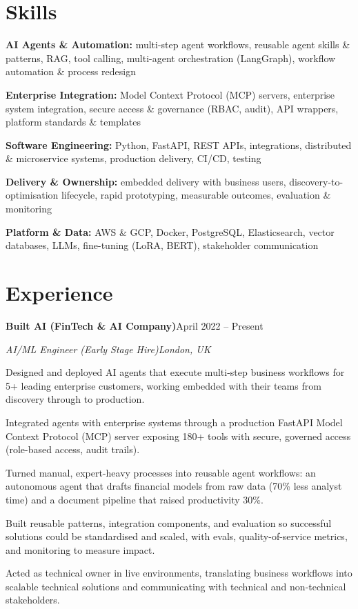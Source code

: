 \documentclass[10pt,a4paper]{article}
\newcommand{\entry}[4]{%
  {\color{company}\bfseries #1}\hfill {\color{muted}#2}\par
  \vspace{1pt}
  {\itshape #3}\hfill {\color{muted}\itshape #4}\par
  \vspace{3pt}%
}
\begin{document}
\section{Skills}
\begin{tight}
  \item[\textcolor{accent}{\small$\bullet$}] \textbf{AI Agents \& Automation:} multi-step agent workflows, reusable agent skills \& patterns, RAG, tool calling, multi-agent orchestration (LangGraph), workflow automation \& process redesign
  \item[\textcolor{accent}{\small$\bullet$}] \textbf{Enterprise Integration:} Model Context Protocol (MCP) servers, enterprise system integration, secure access \& governance (RBAC, audit), API wrappers, platform standards \& templates
  \item[\textcolor{accent}{\small$\bullet$}] \textbf{Software Engineering:} Python, FastAPI, REST APIs, integrations, distributed \& microservice systems, production delivery, CI/CD, testing
  \item[\textcolor{accent}{\small$\bullet$}] \textbf{Delivery \& Ownership:} embedded delivery with business users, discovery-to-optimisation lifecycle, rapid prototyping, measurable outcomes, evaluation \& monitoring
  \item[\textcolor{accent}{\small$\bullet$}] \textbf{Platform \& Data:} AWS \& GCP, Docker, PostgreSQL, Elasticsearch, vector databases, LLMs, fine-tuning (LoRA, BERT), stakeholder communication
\end{tight}

\section{Experience}
\entry{Built AI (FinTech \& AI Company)}{April 2022 -- Present}{AI/ML Engineer (Early Stage Hire)}{London, UK}
\begin{tight}
  \item Designed and deployed AI agents that execute multi-step business workflows for 5+ leading enterprise customers, working embedded with their teams from discovery through to production.
  \item Integrated agents with enterprise systems through a production FastAPI Model Context Protocol (MCP) server exposing 180+ tools with secure, governed access (role-based access, audit trails).
  \item Turned manual, expert-heavy processes into reusable agent workflows: an autonomous agent that drafts financial models from raw data (70\% less analyst time) and a document pipeline that raised productivity 30\%.
  \item Built reusable patterns, integration components, and evaluation so successful solutions could be standardised and scaled, with evals, quality-of-service metrics, and monitoring to measure impact.
  \item Acted as technical owner in live environments, translating business workflows into scalable technical solutions and communicating with technical and non-technical stakeholders.
\end{tight}
\end{document}
